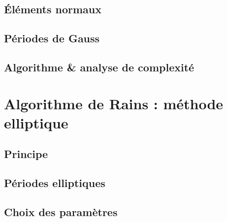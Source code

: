 \documentclass[a4paper]{article} %
\numberwithin{section}{part}
\numberwithin{equation}{section}
\begin{document}
\subsection{Éléments normaux}
\label{secelemnorm}

\subsection{Périodes de Gauss}
\label{pergauss}

\subsection{Algorithme \& analyse de complexité}

\section{Algorithme de Rains : méthode elliptique}
\subsection{Principe}

\subsection{Périodes elliptiques}


\subsection{Choix des paramètres}
\end{document}
